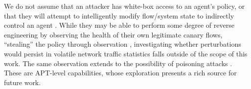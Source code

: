 We do not assume that an attacker has white-box access to an agent's policy, or that they will attempt to intelligently modify flow/system state to indirectly control an agent \cite{DBLP:conf/eurosp/PapernotMJFCS16, DBLP:conf/eurosp/PapernotMSW18, DBLP:journals/corr/HuangPGDA17, DBLP:conf/sp/Carlini017}.
While they may be able to perform some degree of reverse engineering by observing the health of their own legitimate canary flows, ``stealing'' the policy through observation \cite{DBLP:conf/uss/TramerZJRR16}, investigating whether perturbations would persist in volatile network traffic statistics falls outside of the scope of this work.
The same observation extends to the possibility of poisoning attacks \cite{DBLP:journals/corr/abs-1902-09062}.
These are APT-level capabilities, whose exploration presents a rich source for future work.